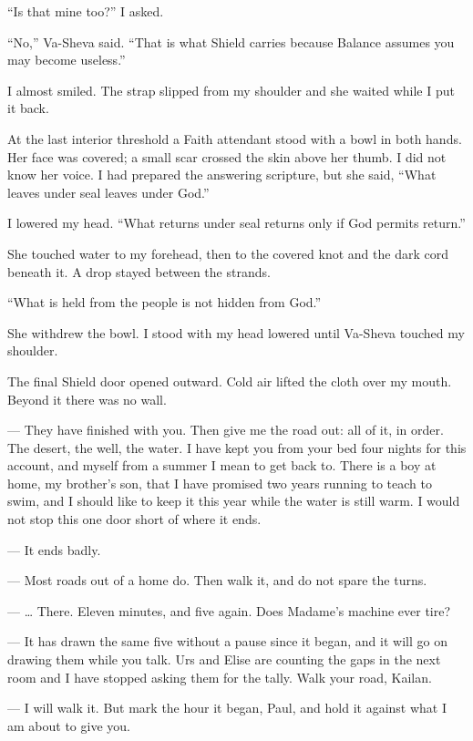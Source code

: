 ``Is that mine too?'' I asked.\par

``No,'' Va-Sheva said. ``That is what Shield carries because Balance assumes you may become useless.''\par

I almost smiled. The strap slipped from my shoulder and she waited while I put it back.\par

At the last interior threshold a Faith attendant stood with a bowl in both hands. Her face was covered; a small scar crossed the skin above her thumb. I did not know her voice. I had prepared the answering scripture, but she said, ``What leaves under seal leaves under God.''\par

I lowered my head. ``What returns under seal returns only if God permits return.''\par

She touched water to my forehead, then to the covered knot and the dark cord beneath it. A drop stayed between the strands.\par

``What is held from the people is not hidden from God.''\par

She withdrew the bowl. I stood with my head lowered until Va-Sheva touched my shoulder.\par

The final Shield door opened outward. Cold air lifted the cloth over my mouth. Beyond it there was no wall.\par

\ornament

\begin{room}

--- They have finished with you. Then give me the road out: all of it, in order. The desert, the well, the water. I have kept you from your bed four nights for this account, and myself from a summer I mean to get back to. There is a boy at home, my brother's son, that I have promised two years running to teach to swim, and I should like to keep it this year while the water is still warm. I would not stop this one door short of where it ends.

--- It ends badly.

--- Most roads out of a home do. Then walk it, and do not spare the turns.

--- \ldots{} There. Eleven minutes, and five again. Does Madame's machine ever tire?

--- It has drawn the same five without a pause since it began, and it will go on drawing them while you talk. Urs and Elise are counting the gaps in the next room and I have stopped asking them for the tally. Walk your road, Kailan.

--- I will walk it. But mark the hour it began, Paul, and hold it against what I am about to give you.

\end{room}

